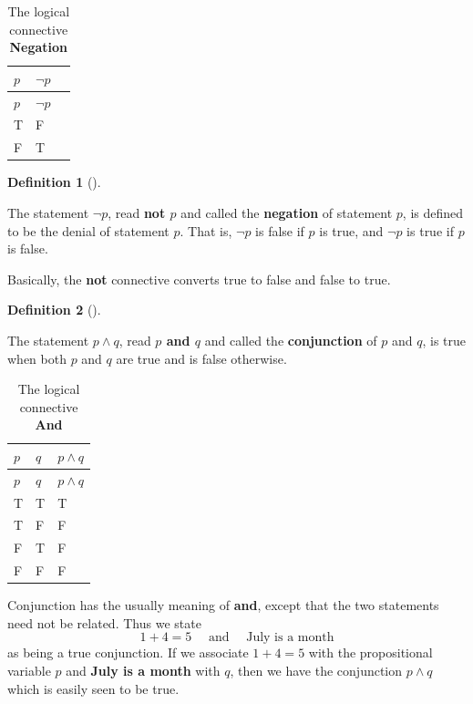 \documentclass[
  letterpaper,
  10pt,
  reqno,
  twopage,
  openany]{book}
\theoremstyle{plain}
\theoremstyle{definition}
\theoremstyle{definition}
\newtheorem{definition}{Definition}[chapter]
\theoremstyle{definition}
\theoremstyle{plain}
\theoremstyle{plain}
\theoremstyle{remark}
\begin{document}
\hypertarget{tbl-lc}{}
\begin{longtable}[]{@{}lll@{}}
\caption{\label{tbl-lc}The logical connective
\textbf{Negation}}\tabularnewline
\toprule()
\(p\) & \(\neg p\) & \\
\midrule()
\endfirsthead
\toprule()
\(p\) & \(\neg p\) & \\
\midrule()
\endhead
T & F & \\
F & T & \\
\bottomrule()
\end{longtable}

\leavevmode{}%
\begin{definition}[]\label{def-negation}

The statement \(\neg p\), read \textbf{not \(p\)} and called the
 \textbf{negation} of statement \(p\), is defined to be
the denial of statement \(p\). That is, \(\neg p\) is false if \(p\) is
true, and \(\neg p\) is true if \(p\) is false.

\end{definition}

Basically, the  \textbf{not} connective converts true to
false and false to true.

\leavevmode{}%
\begin{definition}[]\label{def-conjunction}

The statement \(p\land q\), read \textbf{\(p\) and \(q\)} and called the
 \textbf{conjunction} of \(p\) and \(q\), is true
when both \(p\) and \(q\) are true and is false otherwise.

\end{definition}

\hypertarget{tbl-and}{}
\begin{longtable}[]{@{}lll@{}}
\caption{\label{tbl-and}The logical connective
\textbf{And}}\tabularnewline
\toprule()
\(p\) & \(q\) & \(p\land q\) \\
\midrule()
\endfirsthead
\toprule()
\(p\) & \(q\) & \(p\land q\) \\
\midrule()
\endhead
T & T & T \\
T & F & F \\
F & T & F \\
F & F & F \\
\bottomrule()
\end{longtable}

Conjunction has the usually meaning of \textbf{and}, except that the two
statements need not be related. Thus we state \[
1+4=5 \quad \text{ and}\quad \text{ July is a month}
\] as being a true conjunction. If we associate \textbf{\(1+4=5\)} with
the propositional variable \(p\) and \textbf{July is a month} with
\(q\), then we have the conjunction \(p\land q\) which is easily seen to
be true.
\end{document}
